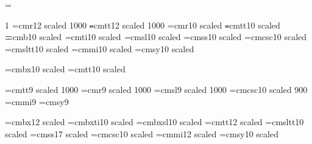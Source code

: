 \begin{\parsearg\beginxxx}
\def\ttsl{\tenttsl}

\newcount\mainmagstep
\mainmagstep=\magstephalf

\def\setfont#1#2#3#4{\font#1=\fontprefix#2#3 scaled #4}

\ifx\fontprefix\undefined
\def\fontprefix{cm}
\fi
\def\rmshape{r}
\def\rmbshape{bx}               %
\def\bfshape{b}
\def\bxshape{bx}
\def\ttshape{tt}
\def\ttbshape{tt}
\def\ttslshape{sltt}
\def\itshape{ti}
\def\itbshape{bxti}
\def\slshape{sl}
\def\slbshape{bxsl}
\def\sfshape{ss}
\def\sfbshape{ss}
\def\scshape{csc}
\def\scbshape{csc}

\ifx\bigger\relax
\let\mainmagstep=\magstep1
\setfont\textrm\rmshape{12}{1000}
\setfont\texttt\ttshape{12}{1000}
\else
\setfont\textrm\rmshape{10}{\mainmagstep}
\setfont\texttt\ttshape{10}{\mainmagstep}
\fi
\setfont\textbf\bfshape{10}{\mainmagstep}
\setfont\textit\itshape{10}{\mainmagstep}
\setfont\textsl\slshape{10}{\mainmagstep}
\setfont\textsf\sfshape{10}{\mainmagstep}
\setfont\textsc\scshape{10}{\mainmagstep}
\setfont\textttsl\ttslshape{10}{\mainmagstep}
\font\texti=cmmi10 scaled \mainmagstep
\font\textsy=cmsy10 scaled \mainmagstep

\setfont{}\bxshape{10}{} %
\setfont{}\ttshape{10}{}
\def\df{\let\tentt=\deftt \let\tenbf = \defbf \bf}

\setfont\ninett\ttshape{9}{1000}
\setfont\indrm\rmshape{9}{1000}
\setfont\indit\slshape{9}{1000}
\let\indsl=\indit
\let\indtt=\ninett
\let\indttsl=\ninett
\let\indsf=\indrm
\let\indbf=\indrm
\setfont\indsc\scshape{10}{900}
\font\indi=cmmi9
\font\indsy=cmsy9

\setfont\titlerm\rmbshape{12}{}
\setfont\titleit\itbshape{10}{}
\setfont\titlesl\slbshape{10}{}
\setfont\titlett\ttbshape{12}{}
\setfont\titlettsl\ttslshape{10}{}
\setfont\titlesf\sfbshape{17}{}
\let\titlebf=\titlerm
\setfont\titlesc\scbshape{10}{}
\font\titlei=cmmi12 scaled 
\font\titlesy=cmsy10 scaled 
\def\authorrm{\secrm}


\end{\parsearg\beginxxx}
